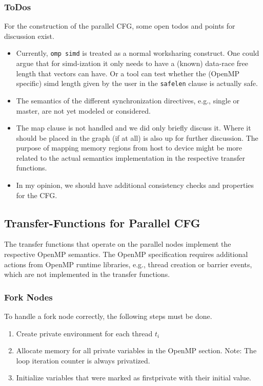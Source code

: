 \documentclass[natbib]{article}
\begin{document}
\subsubsection{ToDos}
For the construction of the parallel CFG, some open todos and points for discussion exist.
\begin{itemize}
	\item Currently, \texttt{omp simd} is treated as a normal worksharing construct. One could argue that for simd-ization it only needs to have a (known) data-race free length that vectors can have. Or a tool can test whether the (OpenMP specific) simd length given by the user in the \texttt{safelen} clause is actually safe.
  \item The semantics of the different synchronization directives, e.g., single or master, are not yet modeled or considered.
	\item The map clause is not handled and we did only briefly discuss it. Where it should be placed in the graph (if at all) is also up for further discussion. The purpose of mapping memory regions from host to device might be more related to the actual semantics implementation in the respective transfer functions.
  \item In my opinion, we should have additional consistency checks and properties for the CFG.
\end{itemize}

\subsection{Transfer-Functions for Parallel CFG}\label{sec:par_transfer_functions}
The transfer functions that operate on the parallel nodes implement the respective OpenMP semantics.
The OpenMP specification requires additional actions from OpenMP runtime libraries, e.g., thread creation or barrier events, which are not implemented in the transfer functions.

\subsubsection{Fork Nodes}
To handle a fork node correctly, the following steps must be done.
\begin{enumerate}
\item Create private environment for each thread $t_i$
\item Allocate memory for all private variables in the OpenMP section.
Note: The loop iteration counter is always privatized.
\item Initialize variables that were marked as firstprivate with their initial value.
\end{enumerate}
\end{document}
